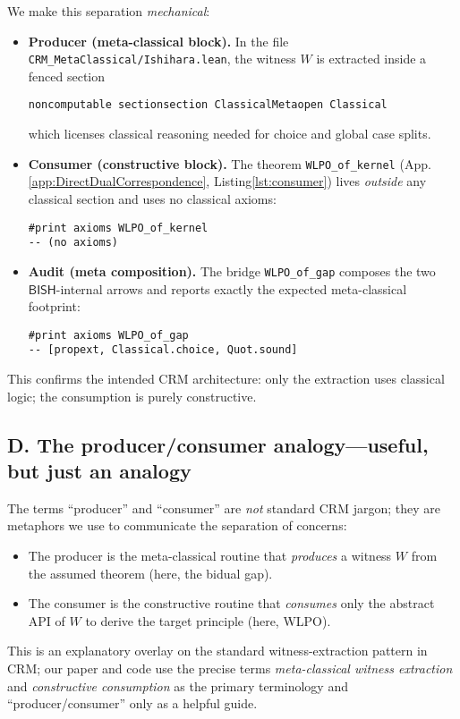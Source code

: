 \documentclass[11pt]{article}
\begin{document}
We make this separation \emph{mechanical}:
\begin{itemize}
\item \textbf{Producer (meta-classical block).}
In the file \texttt{CRM\_MetaClassical/Ishihara.lean}, the witness $W$ is extracted inside a fenced section
\begin{center}
\texttt{noncomputable section}\quad\texttt{section ClassicalMeta}\quad\texttt{open Classical}
\end{center}
which licenses classical reasoning needed for choice and global case splits.
\item \textbf{Consumer (constructive block).}
The theorem \texttt{WLPO\_of\_kernel} (App.\ref{app:DirectDualCorrespondence}, Listing\ref{lst:consumer}) lives \emph{outside} any classical section and uses no classical axioms:
\begin{verbatim}
#print axioms WLPO_of_kernel
-- (no axioms)
\end{verbatim}
\item \textbf{Audit (meta composition).}
The bridge \texttt{WLPO\_of\_gap} composes the two $\mathsf{BISH}$-internal arrows and reports exactly the expected meta-classical footprint:
\begin{verbatim}
#print axioms WLPO_of_gap
-- [propext, Classical.choice, Quot.sound]
\end{verbatim}
\end{itemize}

This confirms the intended CRM architecture: only the extraction uses classical logic; the consumption is purely constructive.

\subsection*{D. The producer/consumer analogy---useful, but just an analogy}

The terms ``producer'' and ``consumer'' are \emph{not} standard CRM jargon; they are metaphors we use to communicate the separation of concerns:
\begin{itemize}
\item The producer is the meta-classical routine that \emph{produces} a witness $W$ from the assumed theorem (here, the bidual gap).
\item The consumer is the constructive routine that \emph{consumes} only the abstract API of $W$ to derive the target principle (here, WLPO).
\end{itemize}

This is an explanatory overlay on the standard witness-extraction pattern in CRM; our paper and code use the precise terms \emph{meta-classical witness extraction} and \emph{constructive consumption} as the primary terminology and ``producer/consumer'' only as a helpful guide.
\end{document}
